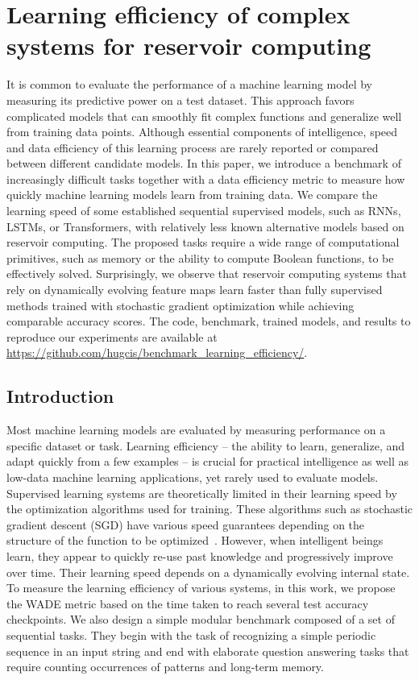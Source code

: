 \chapter{Learning efficiency of complex systems for reservoir computing}
\label{cha:learn-effic-compl}

  It is common to evaluate the performance of a machine learning model by
  measuring its predictive power on a test dataset. This approach favors
  complicated models that can smoothly fit complex functions and generalize well
  from training data points. Although essential components of intelligence,
  speed and data efficiency of this learning process are rarely reported or
  compared between different candidate models. In this paper, we introduce a
  benchmark of increasingly difficult tasks together with a data efficiency
  metric to measure how quickly machine learning models learn from training
  data. We compare the learning speed of some established sequential supervised
  models, such as RNNs, LSTMs, or Transformers, with relatively less known
  alternative models based on reservoir computing. The proposed tasks require a
  wide range of computational primitives, such as memory or the ability to
  compute Boolean functions, to be effectively solved. Surprisingly, we observe
  that reservoir computing systems that rely on dynamically evolving feature
  maps learn faster than fully supervised methods trained with stochastic
  gradient optimization while achieving comparable accuracy scores. The code,
  benchmark, trained models, and results to reproduce our experiments are
  available at {\small\url{https://github.com/hugcis/benchmark_learning_efficiency/}}.


\section{Introduction}
Most machine learning models are evaluated by measuring performance on a
specific dataset or task. Learning efficiency -- the ability to learn,
generalize, and adapt quickly from a few examples -- is crucial for practical
intelligence \cite{kanazawaGeneralIntelligenceDomainspecific2004} as well as
low-data machine learning applications, yet rarely used to evaluate models.
Supervised learning systems are theoretically limited in their learning speed by
the optimization algorithms used for training. These algorithms such as
stochastic gradient descent (SGD) have various speed guarantees depending on the
structure of the function to be
optimized~\cite{bottouOptimizationMethodsLargescale2018}. However, when
intelligent beings learn, they appear to quickly re-use past knowledge and
progressively improve over time. Their learning speed depends on a dynamically
evolving internal state.
To measure the learning efficiency of various systems, in this work, we propose the \ac{WADE}
metric based on the time taken to reach several test accuracy checkpoints. We
also design a simple modular benchmark composed of a set of sequential tasks.
They begin with the task of recognizing a simple periodic sequence in an input
string and end with elaborate question answering tasks that require counting
occurrences of patterns and long-term memory.

